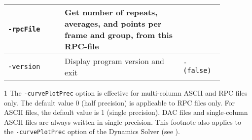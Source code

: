 \begin{threeparttable}[b]
\begin{tabular}{|>{\raggedright} p{0.23\linewidth}| p{0.48\linewidth}| p{0.16\linewidth}|}
  \hline
  \texttt{-rpcFile}      &   Get number of repeats, averages, and points per frame and group, from this RPC-file & \\
  \hline
  \texttt{-version}      &   Display program version and exit & \texttt{- (false)}  \\
  \hline
\end{tabular}
  \begin{tablenotes}
    \item[1] {The {\tt-curvePlotPrec} option is effective for multi-column ASCII and RPC files only.
      The default value 0 (half precision) is applicable to RPC files only. For ASCII files,
      the default value is 1 (single precision). DAC files and single-column ASCII files
      are always written in single precision. This footnote also applies to the
      {\tt-curvePlotPrec} option of the Dynamics Solver
      (see ).}
  \end{tablenotes}
\end{threeparttable}
